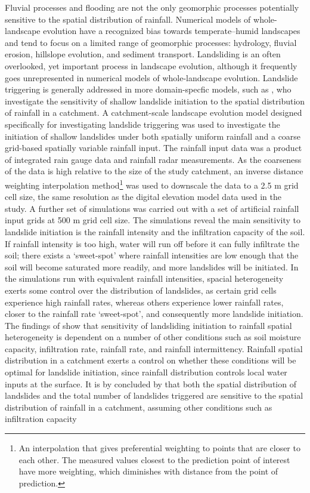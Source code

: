 Fluvial processes and flooding are not the only geomorphic processes potentially sensitive to the spatial distribution of rainfall. Numerical models of whole-landscape evolution have a recognized bias towards temperate--humid landscapes \citep{Pazzaglia2003,Tucker2010} and tend to focus on a limited range of geomorphic processes: hydrology, fluvial erosion, hillslope evolution, and sediment transport. Landsliding is an often overlooked, yet important process in landscape evolution, although it frequently goes unrepresented in numerical models of whole-landscape evolution\citep{Tucker2010}. Landslide triggering is generally addressed in more domain-specfic models, such as \citet{von2014effects}, who investigate the sensitivity of shallow landslide initiation to the spatial distribution of rainfall in a catchment. A catchment-scale landscape evolution model designed specifically for investigating landslide triggering \citep[the \emph{CHLT} model][]{vonruette2013rainfall} was used to investigate the initiation of shallow landslides under both spatially uniform rainfall and a coarse grid-based spatially variable rainfall input. The rainfall input data was a product of integrated rain gauge data and rainfall radar measurements. As the coarseness of the data is high relative to the size of the study catchment, an inverse distance weighting interpolation method\footnote{An interpolation that gives preferential weighting to points that are closer to each other. The measured values closest to the prediction point of interest have more weighting, which diminishes with distance from the point of prediction.} was used to downscale the data to a 2.5 m grid cell size, the same resolution as the digital elevation model data used in the study. A further set of simulations was carried out with a set of artificial rainfall input grids at 500 m grid cell size. The simulations reveal the main sensitivity to landslide initiation is the rainfall intensity and the infiltration capacity of the soil. If rainfall intensity is too high, water will run off before it can fully infiltrate the soil; there exists a `sweet-spot' where rainfall intensities are low enough that the soil will become saturated more readily, and more landslides will be initiated. In the simulations run with equivalent rainfall intensities, spacial heterogeneity exerts some control over the distribution of landslides, as certain grid cells experience high rainfall rates, whereas others experience lower rainfall rates, closer to the rainfall rate `sweet-spot', and consequently more landslide initiation. The findings of \citet{vonruette2013rainfall} show that sensitivity of landsliding initiation to rainfall spatial heterogeneity is dependent on a number of other conditions such as soil moisture capacity, infiltration rate, rainfall rate, and rainfall intermittency. Rainfall spatial distribution in a catchment exerts a control on whether these conditions will be optimal for landslide initiation, since rainfall distribution controls local water inputs at the surface. It is by concluded by \citet{vonruette2013rainfall} that both the spatial distribution of landslides and the total number of landslides triggered are sensitive to the spatial distribution of rainfall in a catchment, assuming other conditions such as infiltration capacity 